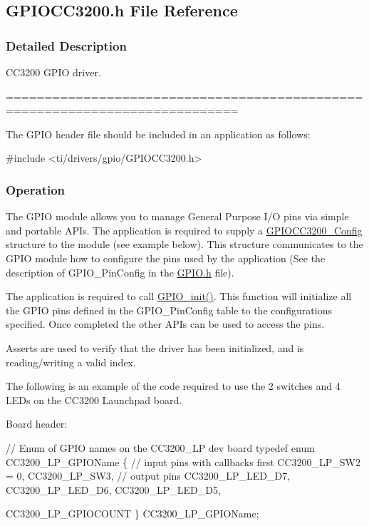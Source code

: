 \subsection{G\+P\+I\+O\+C\+C3200.\+h File Reference}
\label{_g_p_i_o_c_c3200_8h}


\subsubsection{Detailed Description}
C\+C3200 G\+P\+I\+O driver. 

============================================================================

The G\+P\+I\+O header file should be included in an application as follows\+: 
\begin{DoxyCode}
\textcolor{preprocessor}{#include <ti/drivers/gpio/GPIOCC3200.h>}
\end{DoxyCode}


\subsubsection*{Operation}

The G\+P\+I\+O module allows you to manage General Purpose I/\+O pins via simple and portable A\+P\+Is. The application is required to supply a \hyperlink{struct_g_p_i_o_c_c3200___config}{G\+P\+I\+O\+C\+C3200\+\_\+\+Config} structure to the module (see example below). This structure communicates to the G\+P\+I\+O module how to configure the pins used by the application (See the description of G\+P\+I\+O\+\_\+\+Pin\+Config in the \hyperlink{_g_p_i_o_8h}{G\+P\+I\+O.\+h} file).

The application is required to call \hyperlink{_g_p_i_o_8h_a7aaec489dca5ac4d278d2eb3ae38a2d2}{G\+P\+I\+O\+\_\+init()}. This function will initialize all the G\+P\+I\+O pins defined in the G\+P\+I\+O\+\_\+\+Pin\+Config table to the configurations specified. Once completed the other A\+P\+Is can be used to access the pins.

Asserts are used to verify that the driver has been initialized, and is reading/writing a valid index.

The following is an example of the code required to use the 2 switches and 4 L\+E\+Ds on the C\+C3200 Launchpad board.

Board header\+: 
\begin{DoxyCode}
\textcolor{comment}{// Enum of GPIO names on the CC3200\_LP dev board}
\textcolor{keyword}{typedef} \textcolor{keyword}{enum} CC3200\_LP\_GPIOName \{
    \textcolor{comment}{// input pins with callbacks first}
    CC3200\_LP\_SW2 = 0,
    CC3200\_LP\_SW3,
    \textcolor{comment}{// output pins}
    CC3200\_LP\_LED\_D7,
    CC3200\_LP\_LED\_D6,
    CC3200\_LP\_LED\_D5,

    CC3200\_LP\_GPIOCOUNT
\} CC3200\_LP\_GPIOName;
\end{DoxyCode}


